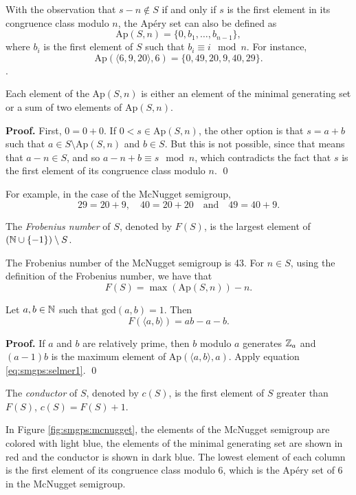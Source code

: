 With the observation that $s - n \notin S$ if and only if $s$ is the first element in its congruence class modulo $n$, the Apéry set can also be defined as  
\[\text{Ap}(S, n) =  \{0, b_1, \ldots, b_{n - 1}\},\]
where $b_i$ is the first element of $S$ such that \(b_i \equiv i \mod n\). 
For instance, \[\text{Ap}(\langle 6, 9, 20 \rangle, 6) = \{0, 49, 20, 9, 40, 29\}.\]. 
\begin{proposition}
    Each element of the $\text{Ap}(S, n)$ is either an element of the minimal generating set or a sum of two elements of $\text{Ap}(S, n)$. 
\end{proposition}
\textbf{Proof. } First, $0 = 0 + 0$. If $0 < s \in \text{Ap}(S, n)$, the other option is that $s = a + b$ such that $a \in S\setminus\text{Ap}(S, n)$ and $b \in S$. But this is not possible, since that means that $a - n \in S$, and so $a - n + b \equiv s \mod n$, which contradicts the fact that $s$ is the first element of its congruence class modulo $n$. \qed \par  
For example, in the case of the McNugget semigroup,
\[29 = 20 + 9, \quad 40 = 20 + 20 \quad \text{and} \quad 49 = 40 + 9.\]
\begin{definition}\label{def:smgps:frobeniusnum}
    The \textit{Frobenius number} of $S$, denoted by $F(S)$, is the largest element of $(\mathbb{N} \cup \{-1\}) \setminus S$.
\end{definition}

The Frobenius number of the McNugget semigroup is 43. For $n \in S$, using the definition of the Frobenius number, we have that
\begin{equation}\label{eq:smgps:selmer1}
    F(S) = \max (\text{Ap}(S, n)) - n.
\end{equation}

\begin{proposition} Let $a, b \in \mathbb{N}$ such that $\text{gcd}(a, b) = 1$. Then 
    \[F(\langle a, b \rangle) = ab - a - b.\] 
\end{proposition}
\textbf{Proof. } If $a$ and $b$ are relatively prime, then $b$ modulo $a$ generates $\mathbb{Z}_a$ and $(a - 1)b$ is the maximum element of $\text{Ap}(\langle a, b\rangle, a)$. Apply equation \ref{eq:smgps:selmer1}. \qed

\begin{definition}
    The \textit{conductor} of $S$, denoted by $c(S)$, is the first element of $S$ greater than $F(S)$, $c(S) = F(S) + 1$.
\end{definition}
In Figure \ref{fig:smgps:mcnugget}, the elements of the McNugget semigroup are colored with light blue, the elements of the minimal generating set are shown in red and the conductor is shown in dark blue. The lowest element of each column is the first element of its congruence class modulo 6, which is the Apéry set of 6 in the McNugget semigroup. \par

